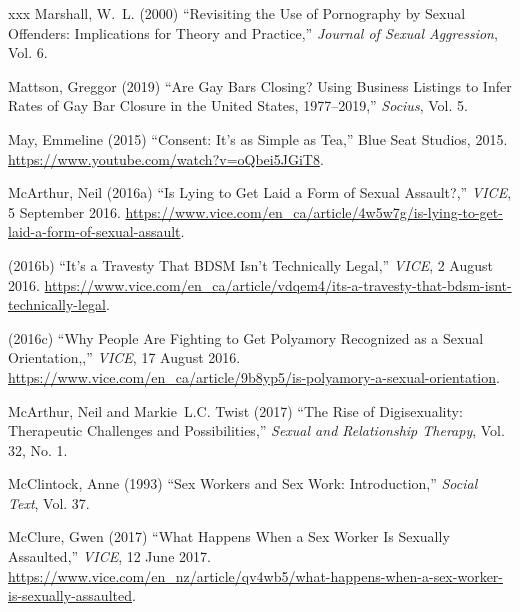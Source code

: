 \documentclass[]{jlreq} \usepackage{mystyle}
\begin{document}
\begin{thebibliography}{xxx}
Marshall, W.~L. (2000) ``Revisiting the Use of Pornography by Sexual Offenders:
  Implications for Theory and Practice,'' \textit{ Journal of Sexual
  Aggression}, Vol. 6.

Mattson, Greggor (2019) ``Are Gay Bars Closing? Using Business Listings to
  Infer Rates of Gay Bar Closure in the United States, 1977--2019,'' \textit{
  Socius}, Vol. 5.

May, Emmeline (2015) ``Consent: It's as Simple as Tea,'' Blue Seat Studios,
  2015. \url{https://www.youtube.com/watch?v=oQbei5JGiT8}.

McArthur, Neil (2016a) ``Is Lying to Get Laid a Form of Sexual Assault?,''
  \emph{VICE}, 5 September 2016.
  \url{https://www.vice.com/en_ca/article/4w5w7g/is-lying-to-get-laid-a-form-of-sexual-assault}.

 \bysame{}  (2016b) ``It's a Travesty That BDSM Isn't Technically Legal,''
  \emph{VICE}, 2 August 2016.
  \url{https://www.vice.com/en_ca/article/vdqem4/its-a-travesty-that-bdsm-isnt-technically-legal}.

 \bysame{}  (2016c) ``Why People Are Fighting to Get Polyamory Recognized as a
  Sexual Orientation,,'' \emph{VICE}, 17 August 2016.
  \url{https://www.vice.com/en_ca/article/9b8yp5/is-polyamory-a-sexual-orientation}.

McArthur, Neil and Markie~L.C. Twist (2017) ``The Rise of Digisexuality:
  Therapeutic Challenges and Possibilities,'' \textit{ Sexual and Relationship
  Therapy}, Vol. 32, No. 1.

McClintock, Anne (1993) ``Sex Workers and Sex Work: Introduction,'' \textit{
  Social Text}, Vol. 37.

McClure, Gwen (2017) ``What Happens When a Sex Worker Is Sexually Assaulted,''
  \emph{VICE}, 12 June 2017.
  \url{https://www.vice.com/en_nz/article/qv4wb5/what-happens-when-a-sex-worker-is-sexually-assaulted}.


\end{thebibliography}
\end{document}
